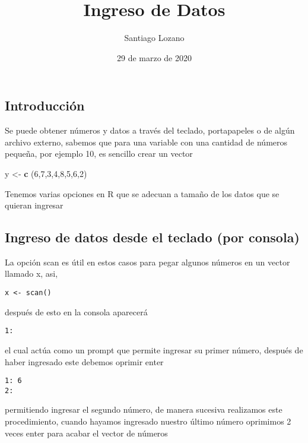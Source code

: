 \documentclass[]{article}
\title{Ingreso de Datos}
\author{Santiago Lozano}
\date{29 de marzo de 2020}
\newenvironment{Shaded}{\begin{snugshade}}{\end{snugshade}}
\newcommand{\KeywordTok}[1]{\textcolor[rgb]{0.13,0.29,0.53}{\textbf{#1}}}
\newcommand{\DecValTok}[1]{\textcolor[rgb]{0.00,0.00,0.81}{#1}}
\newcommand{\StringTok}[1]{\textcolor[rgb]{0.31,0.60,0.02}{#1}}
\newcommand{\NormalTok}[1]{#1}
\begin{document}
\maketitle

\subsection{Introducción}\label{introducciuxf3n}

Se puede obtener números y datos a través del teclado, portapapeles o de
algún archivo externo, sabemos que para una variable con una cantidad de
números pequeña, por ejemplo 10, es sencillo crear un vector

\begin{Shaded}
\begin{Highlighting}[]
\NormalTok{y <-}\StringTok{ }\KeywordTok{c}\NormalTok{ (}\DecValTok{6}\NormalTok{,}\DecValTok{7}\NormalTok{,}\DecValTok{3}\NormalTok{,}\DecValTok{4}\NormalTok{,}\DecValTok{8}\NormalTok{,}\DecValTok{5}\NormalTok{,}\DecValTok{6}\NormalTok{,}\DecValTok{2}\NormalTok{)}
\end{Highlighting}
\end{Shaded}

Tenemos varias opciones en R que se adecuan a tamaño de los datos que se
quieran ingresar

\subsection{Ingreso de datos desde el teclado (por
consola)}\label{ingreso-de-datos-desde-el-teclado-por-consola}

La opción scan es útil en estos casos para pegar algunos números en un
vector llamado x, asi,

\begin{verbatim}
x <- scan()
\end{verbatim}

después de esto en la consola aparecerá

\begin{verbatim}
1:
\end{verbatim}

el cual actúa como un prompt que permite ingresar su primer número,
después de haber ingresado este debemos oprimir enter

\begin{verbatim}
1: 6
2: 
\end{verbatim}

permitiendo ingresar el segundo número, de manera sucesiva realizamos
este procedimiento, cuando hayamos ingresado nuestro último número
oprimimos 2 veces enter para acabar el vector de números
\end{document}
